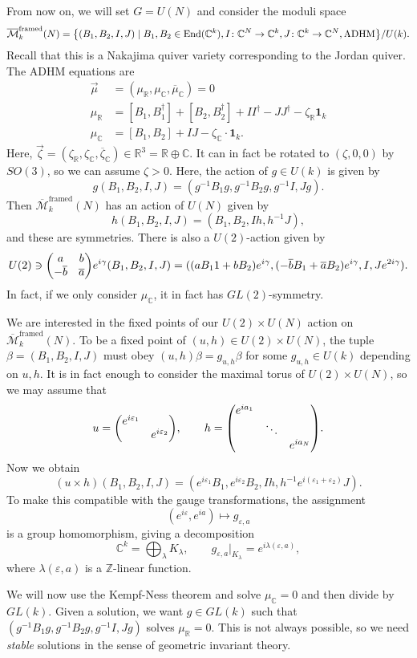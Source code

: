 \documentclass[leqno, openany]{memoir}
\theoremstyle{definition}
\theoremstyle{remark}
\theoremstyle{plain}
\theoremstyle{definition}
\theoremstyle{remark}
\newcommand{\R}{\mathbb{R}}
\newcommand{\C}{\mathbb{C}}
\newcommand{\Z}{\mathbb{Z}}
\newcommand{\ep}{\varepsilon}
\newcommand{\mc}[1]{\mathcal{#1}}
\newcommand{\mr}[1]{\mathrm{#1}}
\newcommand{\ol}[1]{\overline{#1}}
\DeclareMathOperator{\End}{End}
\begin{document}
From now on, we will set $G = U(N)$ and consider the moduli space
\[ \ol{\mc{M}}_k^{\mr{framed}}(N) = \qty{(B_1, B_2, I, J) \mid B_1, B_2 \in \End(\C^k), I \colon \C^N \to \C^k, J \colon \C^k \to \C^N, \text{ADHM}} / U(k). \]
Recall that this is a Nakajima quiver variety corresponding to the Jordan quiver. The ADHM equations are
\begin{align*}
    \vec{\mu} &= (\mu_{\R}, \mu_{\C}, \ol{\mu}_{\C}) = 0 \\
    \mu_{\R} &= [B_1, B_1^{\dag}] + [B_2, B_2^{\dag}] + II^{\dag} - JJ^{\dag} - \zeta_{\R} \mathbf{1}_k \\
    \mu_{\C} &= [B_1, B_2] + IJ - \zeta_{\C} \cdot \mathbf{1}_k.
\end{align*}
Here, $\vec{\zeta} = (\zeta_{\R}, \zeta_{\C}, \ol{\zeta}_{\C}) \in \R^3 = \R \oplus \C$. It can in fact be rotated to $(\zeta, 0, 0)$ by $SO(3)$, so we can assume $\zeta > 0$. Here, the action of $g \in U(k)$ is given by
\[ g(B_1, B_2, I, J) = (g^{-1}B_1 g, g^{-1} B_2 g, g^{-1} I, Jg). \]
Then $\ol{\mc{M}}_k^{\mr{framed}}(N)$ has an action of $U(N)$ given by
\[ h(B_1, B_2, I, J) = (B_1, B_2, Ih, h^{-1}J), \]
and these are symmetries. There is also a $U(2)$-action given by
\[ U(2) \ni \mqty(a & b \\ -\ol{b} & \ol{a}) e^{i\gamma} (B_1, B_2, I, J) = ((aB_11 + bB_2)e^{i\gamma}, (-\ol{b} B_1 + \ol{a} B_2)e^{i\gamma}, I, J e^{2i\gamma}). \]
In fact, if we only consider $\mu_{\C}$, it in fact has $GL(2)$-symmetry.

We are interested in the fixed points of our $U(2) \times U(N)$ action on $\ol{\mc{M}}_k^{\mr{framed}}(N)$. To be a fixed point of $(u,h) \in U(2) \times U(N)$, the tuple $\beta = (B_1, B_2, I, J)$ must obey $(u,h) \beta = g_{u,h} \beta$ for some $g_{u,h} \in U(k)$ depending on $u,h$. It is in fact enough to consider the maximal torus of $U(2) \times U(N)$, so we may assume that
\[ u = \mqty(\dmat{e^{i\ep_1}, e^{i\ep_2}}), \qquad h = \mqty(\dmat{e^{ia_1},\ddots,e^{ia_N}}). \]
Now we obtain
\[ (u \times h)(B_1, B_2, I, J) = (e^{i\ep_1} B_1, e^{i\ep_2} B_2, Ih, h^{-1} e^{i(\ep_1+\ep_2)}J). \]
To make this compatible with the gauge transformations, the assignment
\[ (e^{i\ep}, e^{ia}) \mapsto g_{\ep, a} \]
is a group homomorphism, giving a decomposition
\[ \C^k = \bigoplus_{\lambda} K_{\lambda}, \qquad g_{\ep, a}|_{K_{\lambda}} = e^{i\lambda(\ep, a)}, \]
where $\lambda(\ep, a)$ is a $\Z$-linear function.

We will now use the Kempf-Ness theorem and solve $\mu_{\C} = 0$ and then divide by $GL(k)$. Given a solution, we want $g \in GL(k)$ such that $(g^{-1} B_1 g, g^{-1} B_2 g, g^{-1} I, Jg)$ solves $\mu_{\R} = 0$. This is not always possible, so we need \textit{stable} solutions in the sense of geometric invariant theory.
\end{document}
